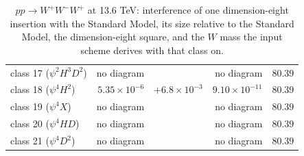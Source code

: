 \begin{table}[t]
\begin{tabular}{@{}lrrrr@{}}
class 17 ($\psi^2 H^3 D^2$) & no diagram &  & no diagram & $80.39$\\
class 18 ($\psi^4 H^2$) & $5.35\times 10^{-6}$ & $+6.8\times 10^{-3}$ & $9.10\times 10^{-11}$ & $80.39$\\
class 19 ($\psi^4 X$) & no diagram &  & no diagram & $80.39$\\
class 20 ($\psi^4 H D$) & no diagram &  & no diagram & $80.39$\\
class 21 ($\psi^4 D^2$) & no diagram &  & no diagram & $80.39$\\
\hline\end{tabular}
\caption{$p p \to W^+ W^- W^+$ at 13.6 TeV: interference of one dimension-eight insertion with the Standard Model, its size relative to the Standard Model, the dimension-eight square, and the $W$ mass the input scheme derives with that class on.}\label{tab:triboson-wpwmwp}\end{table}

